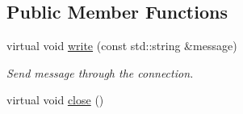 \subsection*{Public Member Functions}
\begin{DoxyCompactItemize}
\item 
virtual void \hyperlink{class_udp_connection_aa6b07228cc03cdeac22a30d7d6fa93db}{write} (const std\-::string \&message)
\begin{DoxyCompactList}\small\item\em Send message through the connection. \end{DoxyCompactList}\item 
\hypertarget{class_udp_connection_aaa4a42e6ed80d5e5d0cd9e6774196104}{virtual void \hyperlink{class_udp_connection_aaa4a42e6ed80d5e5d0cd9e6774196104}{close} ()}\label{class_udp_connection_aaa4a42e6ed80d5e5d0cd9e6774196104}


\end{DoxyCompactItemize}
